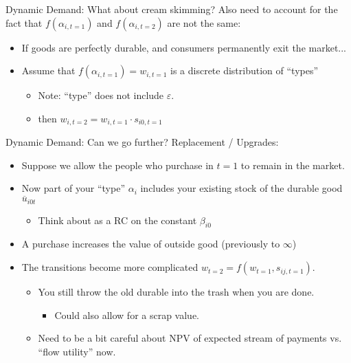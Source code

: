 \begin{frame}{Dynamic Demand: What about cream skimming?}
Also need to account for the fact that $f(\alpha_{i,t=1})$ and $f(\alpha_{i,t=2})$  are not the same:
\begin{itemize}
\item If goods are perfectly durable, and consumers permanently exit the market...
\item Assume that $f(\alpha_{i,t=1}) = w_{i,t=1}$ is a discrete distribution of ``types''
\begin{itemize}
\item Note: ``type'' does not include $\varepsilon$.
\item then $w_{i,t=2} = w_{i,t=1} \cdot s_{i0,t=1}$
\end{itemize}
\end{itemize}
\end{frame}




\begin{frame}{Dynamic Demand: Can we go further?}
Replacement / Upgrades:
\begin{itemize}
\item Suppose we allow the people who purchase in $t=1$ to remain in the market.
\item Now part of your ``type'' $\alpha_i$ includes your existing stock of the durable good $\overline{u}_{i0t}$
\begin{itemize}
\item Think about as a RC on the constant $\beta_{i0}$
\end{itemize}
\item A purchase increases the value of outside good (previously to $\infty$)
\item The transitions become more complicated $w_{t=2} = f(w_{t=1},s_{ij,t=1})$.
\begin{itemize}
\item You still throw the old durable into the trash when you are done.
\begin{itemize}
\item Could also allow for a scrap value.
\end{itemize}
\item Need to be a bit careful about NPV of expected stream of payments vs. ``flow utility'' now.
\end{itemize}
\end{itemize}
\end{frame}



